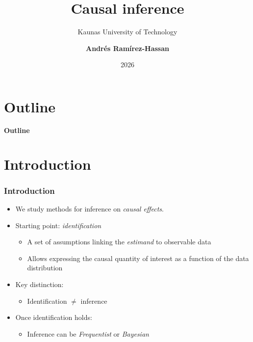 \documentclass[12pt, compress]{beamer}
\title{Causal inference}
\subtitle{Kaunas University of Technology}
\date{2026}
\author[Andr\'e Ram\'irez H.]{\textbf{Andr\'es Ram\'irez-Hassan}}
\institute[EAFIT]{\small{Universidad EAFIT\\School of Finance, Economics and Government}}
\begin{document}
	
	\maketitle
	
	
	
	
	\section*{Outline}
	\begin{frame}
		\textbf{\Large{Outline}}
		\tableofcontents
	\end{frame}
	
\section{Introduction}
	
\begin{frame}
	\frametitle{Introduction}

\begin{itemize}
	\item We study methods for inference on \textit{causal effects}.
	
	\medskip
	
	\item Starting point: \textit{identification}
	\begin{itemize}
		\item A set of assumptions linking the \textit{estimand} to observable data
		\item Allows expressing the causal quantity of interest as a function of the data distribution
	\end{itemize}
	
	\medskip
	
	\item Key distinction:
	\begin{itemize}
		\item Identification $\neq$ inference
	\end{itemize}
	
	\medskip
	
	\item Once identification holds:
	\begin{itemize}
		\item Inference can be \textit{Frequentist} or \textit{Bayesian}
	\end{itemize}
\end{itemize}

\end{frame}
\end{document}
